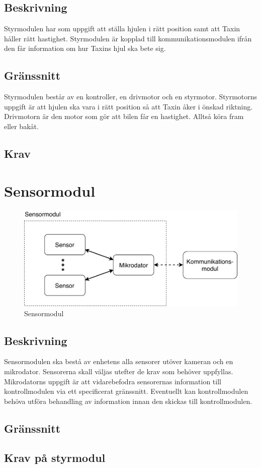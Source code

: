 \documentclass[kravspec/krav.tex]{subfiles}
\begin{document}
\subsection{Beskrivning}
Styrmodulen har som uppgift att ställa hjulen i rätt position samt att Taxin
håller rätt hastighet. Styrmodulen är kopplad till kommunikationsmodulen ifrån
den får information om hur Taxins hjul ska bete sig.
\subsection{Gränssnitt}
Styrmodulen består av en kontroller, en drivmotor och en styrmotor. Styrmotorns
uppgift är att hjulen ska vara i rätt position så att Taxin åker i önskad
riktning. Drivmotorn är den motor som gör att bilen får en hastighet. Alltså
köra fram eller bakåt.
\subsection{Krav}
\begin{reqlist}
    \req{}
\end{reqlist}
\clearpage
\section{Sensormodul}
\begin{figure}[h]
    \centering
    \includegraphics[width=0.6\linewidth]{kravspec/figures/sensormodul.pdf}
    \caption{Sensormodul}
    \label{fig:sensormodul}
\end{figure}

\subsection{Beskrivning}
Sensormodulen ska bestå av enhetens alla sensorer utöver kameran och en
mikrodator. Sensorerna skall väljas utefter de krav som behöver uppfyllas.
Mikrodatorns uppgift är att vidarebefodra sensorernas information till
kontrollmodulen via ett specificerat gränssnitt. Eventuellt kan kontrollmodulen
behöva utföra behandling av information innan den skickas till kontrollmodulen.

\subsection{Gränssnitt}
\subsection{Krav på styrmodul}
\end{document}
